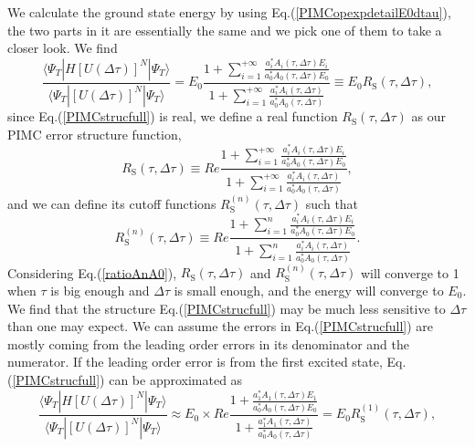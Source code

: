 \documentclass[12pt,letterpaper,UTF8]{report}
\begin{document}
We calculate the ground state energy by using Eq.(\ref{PIMCopexpdetailE0dtau}), the two parts in it are essentially the same and we pick one of them to take a closer look. We find
\begin{equation}
\frac{\langle \Psi_T| H [U(\Delta \tau)]^N  | \Psi_T \rangle}{\langle \Psi_T| [U(\Delta \tau)]^N  | \Psi_T \rangle}
= E_0 \frac{1+ \sum_{i=1}^{+\infty}\frac{a_i^* A_i(\tau,\Delta \tau) E_i }{a_0^* A_0(\tau,\Delta \tau) E_0 }  }
{1+ \sum_{i=1}^{+\infty}\frac{a_i^* A_i(\tau,\Delta \tau) }{a_0^* A_0(\tau,\Delta \tau) }  }
\equiv E_0 R_{\text{S}}(\tau,\Delta \tau) ,
\label{PIMCstrucfull}
\end{equation}
since Eq.(\ref{PIMCstrucfull}) is real, we define a real function $R_{\text{S}}(\tau,\Delta \tau)$ as our PIMC error structure function,
\begin{equation}
R_{\text{S}}(\tau,\Delta \tau)
\equiv Re \frac{1+ \sum_{i=1}^{+\infty}\frac{a_i^* A_i(\tau,\Delta \tau) E_i }{a_0^* A_0(\tau,\Delta \tau) E_0 }  }
{1+ \sum_{i=1}^{+\infty}\frac{a_i^* A_i(\tau,\Delta \tau) }{a_0^* A_0(\tau,\Delta \tau) }  } ,
\label{PIMCstrucRs}
\end{equation}
and we can define its cutoff functions $R^{(n)}_{\text{S}}(\tau,\Delta \tau)$ such that
\begin{equation}
R^{(n)}_{\text{S}}(\tau,\Delta \tau)
\equiv Re \frac{1+ \sum_{i=1}^{n}\frac{a_i^* A_i(\tau,\Delta \tau) E_i }{a_0^* A_0(\tau,\Delta \tau) E_0 }  }
{1+ \sum_{i=1}^{n}\frac{a_i^* A_i(\tau,\Delta \tau) }{a_0^* A_0(\tau,\Delta \tau) }  } .
\label{PIMCstrucRsn}
\end{equation}
Considering Eq.(\ref{ratioAnA0}), $R_{\text{S}}(\tau,\Delta \tau)$ and $R^{(n)}_{\text{S}}(\tau,\Delta \tau)$ will converge to 1 when $\tau$ is big enough and $\Delta \tau$ is small enough, and the energy will converge to $E_0$.
We find that the structure Eq.(\ref{PIMCstrucfull}) may be much less sensitive to $\Delta \tau$ than one may expect.
We can assume the errors in Eq.(\ref{PIMCstrucfull}) are mostly coming from the leading order errors in its denominator and the numerator. If the leading order error is from the first excited state, Eq.(\ref{PIMCstrucfull}) can be approximated as
\begin{equation}
\frac{\langle \Psi_T| H [U(\Delta \tau)]^N  | \Psi_T \rangle}{\langle \Psi_T| [U(\Delta \tau)]^N  | \Psi_T \rangle}
\approx E_0 \times Re \frac{1+ \frac{a_1^* A_1(\tau,\Delta \tau) E_1 }{a_0^* A_0(\tau,\Delta \tau) E_0 }  }
{1+ \frac{a_1^* A_1(\tau,\Delta \tau) }{a_0^* A_0(\tau,\Delta \tau) }  }
=E_0 R^{(1)}_{\text{S}}(\tau,\Delta \tau) ,
\label{PIMCstruc1}
\end{equation}
\end{document}
